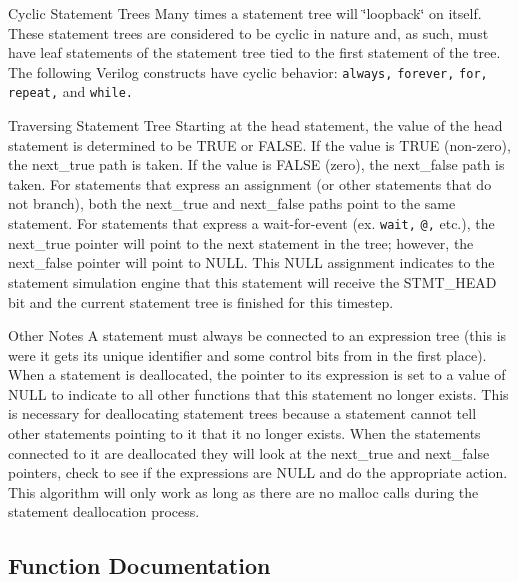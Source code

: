 \begin{Desc}
\item[Cyclic Statement Trees]Many times a statement tree will \char`\"{}loopback\char`\"{} on itself. These statement trees are considered to be cyclic in nature and, as such, must have leaf statements of the statement tree tied to the first statement of the tree. The following Verilog constructs have cyclic behavior: {\tt always,}  {\tt forever,}  {\tt for,}  {\tt repeat,}  and {\tt while.}  \end{Desc}
\begin{Desc}
\item[Traversing Statement Tree]Starting at the head statement, the value of the head statement is determined to be TRUE or FALSE. If the value is TRUE (non-zero), the next\_\-true path is taken. If the value is FALSE (zero), the next\_\-false path is taken. For statements that express an assignment (or other statements that do not branch), both the next\_\-true and next\_\-false paths point to the same statement. For statements that express a wait-for-event (ex. {\tt wait,}  {\tt @,}  etc.), the next\_\-true pointer will point to the next statement in the tree; however, the next\_\-false pointer will point to NULL. This NULL assignment indicates to the statement simulation engine that this statement will receive the STMT\_\-HEAD bit and the current statement tree is finished for this timestep.\end{Desc}
\begin{Desc}
\item[Other Notes]A statement must always be connected to an expression tree (this is were it gets its unique identifier and some control bits from in the first place). When a statement is deallocated, the pointer to its expression is set to a value of NULL to indicate to all other functions that this statement no longer exists. This is necessary for deallocating statement trees because a statement cannot tell other statements pointing to it that it no longer exists. When the statements connected to it are deallocated they will look at the next\_\-true and next\_\-false pointers, check to see if the expressions are NULL and do the appropriate action. This algorithm will only work as long as there are no malloc calls during the statement deallocation process.\end{Desc}


\subsection{Function Documentation}
